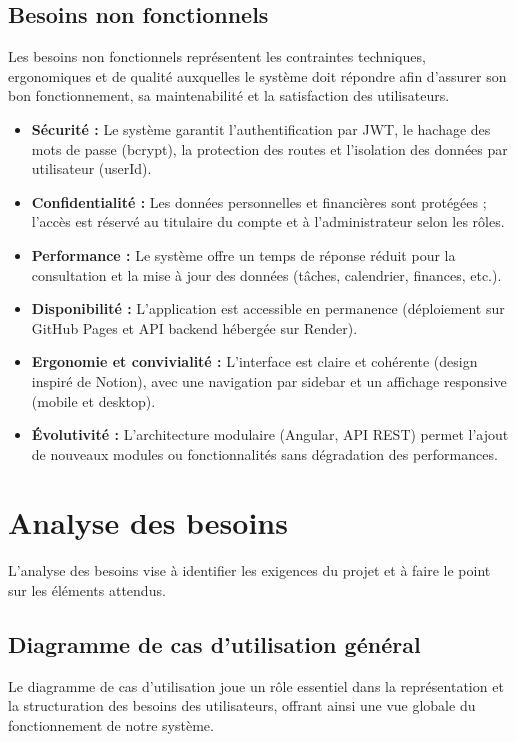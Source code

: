 \subsection{Besoins non fonctionnels}

Les besoins non fonctionnels représentent les contraintes techniques, ergonomiques et de qualité auxquelles le système doit répondre afin d'assurer son bon fonctionnement, sa maintenabilité et la satisfaction des utilisateurs.

\begin{itemize}
  \item \textbf{Sécurité :} Le système garantit l'authentification par JWT, le hachage des mots de passe (bcrypt), la protection des routes et l'isolation des données par utilisateur (userId).

  \item \textbf{Confidentialité :} Les données personnelles et financières sont protégées ; l'accès est réservé au titulaire du compte et à l'administrateur selon les rôles.

  \item \textbf{Performance :} Le système offre un temps de réponse réduit pour la consultation et la mise à jour des données (tâches, calendrier, finances, etc.).

  \item \textbf{Disponibilité :} L'application est accessible en permanence (déploiement sur GitHub Pages et API backend hébergée sur Render).

  \item \textbf{Ergonomie et convivialité :} L'interface est claire et cohérente (design inspiré de Notion), avec une navigation par sidebar et un affichage responsive (mobile et desktop).

  \item \textbf{Évolutivité :} L'architecture modulaire (Angular, API REST) permet l'ajout de nouveaux modules ou fonctionnalités sans dégradation des performances.
\end{itemize}

\section{Analyse des besoins}
L'analyse des besoins vise à identifier les exigences du projet et à faire le point sur les éléments attendus.

\subsection{Diagramme de cas d'utilisation général}
Le diagramme de cas d'utilisation joue un rôle essentiel dans la représentation et la structuration des besoins des utilisateurs, offrant ainsi une vue globale du fonctionnement de notre système.

